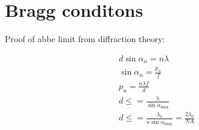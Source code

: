 \section{Bragg conditons}

Proof of abbe limit from diffraction theory:

\begin{align}
    d \sin \alpha_n = n \lambda \\
    \sin\alpha_n = \frac{p_n}{f} \\
    p_n = \frac{n\lambda f}{d} \\
    d \le = \frac{\lambda}{\sin\alpha_{\text{max}}} \\
    d \le = \frac{\lambda_0}{n\sin\alpha_{\text{max}}} = \frac{2\lambda_0}{NA}
\end{align}
